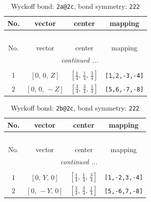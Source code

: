 \documentclass[fleqn,8pt]{jsarticle}
\begin{document}
\begin{longtable}{cccc}
\caption{Wyckoff bond: {\tt 2a@2c}, bond symmetry: {\tt 222}}
 \\
 \hline \hline
No. & vector & center & mapping \\ \hline \endfirsthead

\multicolumn{3}{l}{\tablename\ \thetable{}} \\
 \hline \hline
No. & vector & center & mapping \\ \hline \endhead

 \hline \hline
\multicolumn{3}{r}{\footnotesize\it continued ...} \\ \endfoot

 \hline \hline
\multicolumn{3}{r}{} \\ \endlastfoot

1 & $\left[ 0,\, 0,\, Z \right]$ & $\left[ \frac{1}{4},\, \frac{1}{4},\, \frac{3}{4} \right]$ & {\tt [1,2,-3,-4]} \\ \hline
2 & $\left[ 0,\, 0,\, - Z \right]$ & $\left[ \frac{3}{4},\, \frac{3}{4},\, \frac{1}{4} \right]$ & {\tt [5,6,-7,-8]} \\
\end{longtable}
\renewcommand{\arraystretch}{1.2}
\begin{longtable}{cccc}
\caption{Wyckoff bond: {\tt 2b@2c}, bond symmetry: {\tt 222}}
 \\
 \hline \hline
No. & vector & center & mapping \\ \hline \endfirsthead

\multicolumn{3}{l}{\tablename\ \thetable{}} \\
 \hline \hline
No. & vector & center & mapping \\ \hline \endhead

 \hline \hline
\multicolumn{3}{r}{\footnotesize\it continued ...} \\ \endfoot

 \hline \hline
\multicolumn{3}{r}{} \\ \endlastfoot

1 & $\left[ 0,\, Y,\, 0 \right]$ & $\left[ \frac{1}{4},\, \frac{1}{4},\, \frac{3}{4} \right]$ & {\tt [1,-2,3,-4]} \\ \hline
2 & $\left[ 0,\, - Y,\, 0 \right]$ & $\left[ \frac{3}{4},\, \frac{3}{4},\, \frac{1}{4} \right]$ & {\tt [5,-6,7,-8]} \\
\end{longtable}
\renewcommand{\arraystretch}{1.2}
\end{document}
